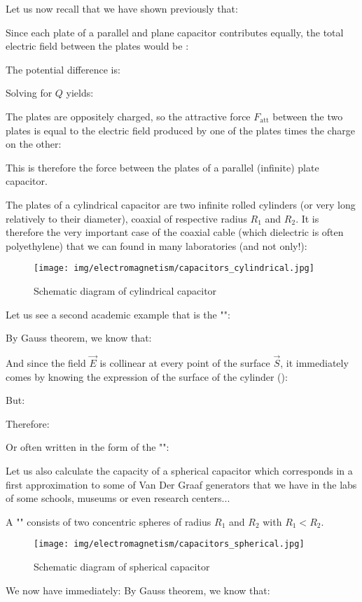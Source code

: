 	Let us now recall that we have shown previously that:
	
	Since each plate of a parallel and plane capacitor contributes equally, the total electric field between the plates would be :
	
	The potential difference is:
	
	Solving for $Q$ yields:
	
	The plates are oppositely charged, so the attractive force $F_\text{att}$ between the two plates is equal to the electric field produced by one of the plates times the charge on the other:
	 
	This is therefore the force between the plates of a parallel (infinite) plate capacitor.
	
	The plates of a cylindrical capacitor are two infinite rolled cylinders (or very long relatively to their diameter), coaxial of respective radius $R_1$ and $R_2$. It is therefore the very important case of the coaxial cable (which dielectric is often polyethylene) that we can found in many laboratories (and not only!):
	\begin{figure}[H]
		\centering
		\texttt{[image: img/electromagnetism/capacitors\_cylindrical.jpg]}
		\caption{Schematic diagram of cylindrical capacitor}
	\end{figure}
	Let us see a second academic example that is the "":

	By Gauss theorem, we know that:
	
	And since the field $\vec{E}$ is collinear at every point of the surface $\vec{S}$, it immediately comes by knowing the expression of the surface of the cylinder ():
	
	But:
	
	Therefore:
	
	Or often written in the form of the "\label{coaxial capacity per unit length}":
	
	Let us also calculate the capacity of a spherical capacitor which corresponds in a first approximation to some of Van Der Graaf generators that we have in the labs of some schools, museums or even research centers...
	
	A "" consists of two concentric spheres of radius $R_1$ and $R_2$ with $R_1<R_2$.
	\begin{figure}[H]
		\centering
		\texttt{[image: img/electromagnetism/capacitors\_spherical.jpg]}
		\caption{Schematic diagram of spherical capacitor}
	\end{figure}
	We now have immediately:
	By Gauss theorem, we know that:
	
